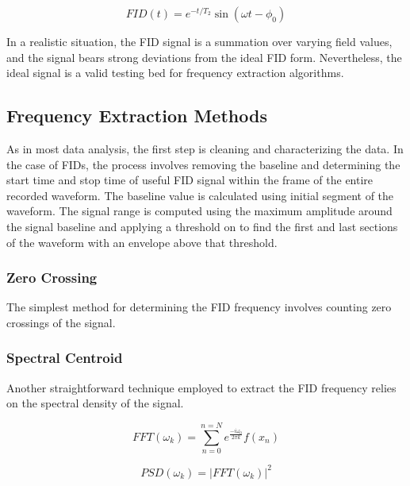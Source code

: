 \begin{equation}
FID(t) = e^{-t/T_2} \sin(\omega t - \phi_0)
\label{eqn:ideal-fid}
\end{equation}

\begin{figure}
\label{fig:ideal-fid}
\end{figure}

In a realistic situation, the FID signal is a summation over varying field values, and the signal bears strong deviations from the ideal FID form.  Nevertheless, the ideal signal is a valid testing bed for frequency extraction algorithms.

\subsection{Frequency Extraction Methods}

As in most data analysis, the first step is cleaning and characterizing the data.  In the case of FIDs, the process involves removing the baseline  and determining the start time and stop time of useful FID signal within the frame of the entire recorded waveform.  The baseline value is calculated using initial segment of the waveform.  The signal range is computed using the maximum amplitude around the signal baseline and applying a threshold on to find the first and last sections of the waveform with an envelope above that threshold.

\subsubsection{Zero Crossing}
The simplest method for determining the FID frequency involves counting zero crossings of the signal.  

\subsubsection{Spectral Centroid}
Another straightforward technique employed to extract the FID frequency relies on the spectral density of the signal. 

\begin{equation}
FFT(\omega_k) = \sum_{n=0}^{n=N} e^\frac{-i \omega_0}{2\pi k} f(x_n)
\label{eqn:fid-fft}
\end{equation}

\begin{equation}
PSD(\omega_k) = |FFT(\omega_k)|^2
\label{eqn:fid-psd}
\end{equation}

